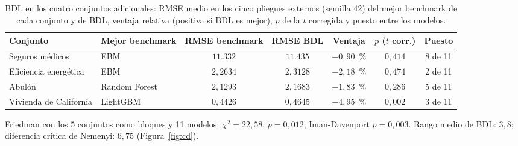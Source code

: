 \begin{table}[tbp]
  \centering\scriptsize\setlength{\tabcolsep}{3pt}
  \caption{BDL en los cuatro conjuntos adicionales: RMSE medio en los cinco pliegues externos (semilla 42) del mejor benchmark de cada conjunto y de BDL, ventaja relativa (positiva si BDL es mejor), $p$ de la $t$ corregida y puesto entre los modelos.}
  \label{tab:conjuntos}
  \begin{tabular}{llccccc}
    \toprule
    Conjunto & Mejor benchmark & RMSE benchmark & RMSE BDL & Ventaja & $p$ ($t$ corr.) & Puesto \\
    \midrule
    Seguros médicos & EBM & $11.332$ & $11.435$ & $-0{,}90$~\% & $0{,}414$ & 8 de 11 \\
    Eficiencia energética & EBM & $2{,}2634$ & $2{,}3128$ & $-2{,}18$~\% & $0{,}474$ & 2 de 11 \\
    Abulón & Random Forest & $2{,}1293$ & $2{,}1683$ & $-1{,}83$~\% & $0{,}286$ & 5 de 11 \\
    Vivienda de California & LightGBM & $0{,}4426$ & $0{,}4645$ & $-4{,}95$~\% & $0{,}002$ & 3 de 11 \\
    \bottomrule
  \end{tabular}
  \par\smallskip\begin{minipage}{0.97\linewidth}\scriptsize Friedman con los 5 conjuntos como bloques y 11 modelos: $\chi^2=22{,}58$, $p=0{,}012$; Iman-Davenport $p=0{,}003$. Rango medio de BDL: $3{,}8$; diferencia crítica de Nemenyi: $6{,}75$ (Figura~\ref{fig:cd}).\end{minipage}
\end{table}

